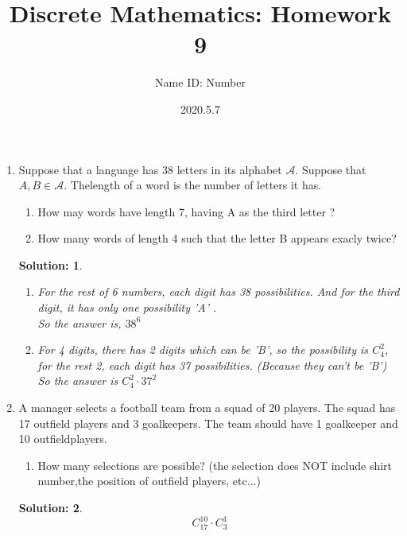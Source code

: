 \documentclass{article}
\title{Discrete Mathematics:  Homework 9}
\author{Name  \quad  \quad ID: Number}
\date{2020.5.7}
\theoremstyle{break}
\newtheorem*{solution*}{\textbf{Solution:} }
\begin{document}
\maketitle
\begin{enumerate}
        \item Suppose that a language has 38 letters in its alphabet $\mathcal{A}$.  Suppose that $A, B \in \mathcal{A}$.  Thelength of a word is the number of letters it has.
        \begin{enumerate}
                \item How may words have length 7, having A as the third letter ? 
                \item How many words of length 4 such that the letter B appears exacly twice?
        \end{enumerate}
        \begin{solution*}
                \begin{enumerate}
                        \item 
                        For the rest of 6 numbers, each digit has 38 possibilities. And for the third digit, it has only one possibility 'A' .\\
                        So the answer is,
                        $  38^6 $
                        \item
                        For 4 digits, there has 2 digits which can be 'B', so the possibility is $C_4^2$, for the rest 2, each digit has 37 possibilities. (Because they can't be 'B') \\
                        So the answer is $C_4^2 \cdot 37^2$
                \end{enumerate}
        \end{solution*}
        \vspace{10mm}
        \item A  manager  selects  a  football  team  from  a  squad  of  20  players.   The  squad  has  17 outfield players and 3 goalkeepers.  The team should have 1 goalkeeper and 10 outfieldplayers.
        \begin{enumerate}
                \item How many selections are possible?  (the selection does NOT include shirt number,the position of outfield players, etc...)
        \end{enumerate}
        \begin{solution*}
                 $$C_{17}^{10} \cdot C_{3}^{1}$$
        \end{solution*}
        \newpage

\end{enumerate}
\end{document}
